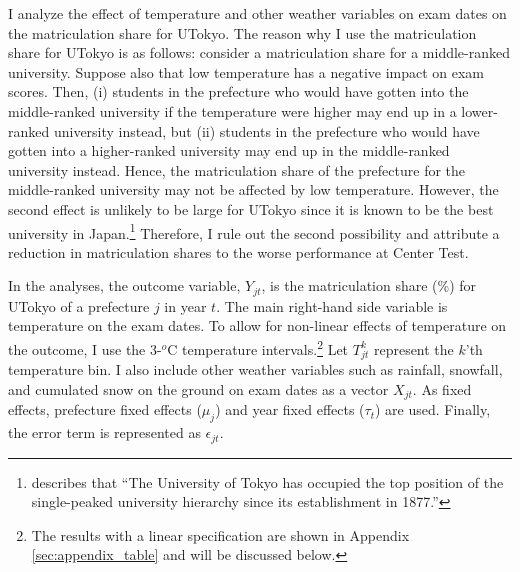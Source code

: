 \documentclass[12pt,letterpaper]{article}
\begin{document}
I analyze the effect of temperature and other weather variables on exam dates on the matriculation share for UTokyo.
The reason why I use the matriculation share for UTokyo is as follows:
consider a matriculation share for a middle-ranked university.
Suppose also that low temperature has a negative impact on exam scores.
Then, 
(i) students in the prefecture who would have gotten into the middle-ranked university if the temperature were higher may end up in a lower-ranked university instead, but
(ii) students in the prefecture who would have gotten into a higher-ranked university may end up in the middle-ranked university instead.
Hence, the matriculation share of the prefecture for the middle-ranked university may not be affected by low temperature.
However, the second effect is unlikely to be large for UTokyo since it is known to be the best university in Japan.\footnote{
  \citet{Kawaguchi2008} describes that ``The University of Tokyo has occupied the top position of the single-peaked university hierarchy since its establishment in 1877.''
}
Therefore, I rule out the second possibility and attribute a reduction in matriculation shares to the worse performance at Center Test.

In the analyses, the outcome variable, $Y_{jt}$, is the matriculation share (\%) for UTokyo of a prefecture $j$ in year $t$.
The main right-hand side variable is temperature on the exam dates.
To allow for non-linear effects of temperature on the outcome, I use the 3-$^o$C temperature intervals.\footnote{
  The results with a linear specification are shown in Appendix \ref{sec:appendix_table} and will be discussed below.
}
Let $T_{jt}^k$ represent the $k$'th temperature bin.
I also include other weather variables such as rainfall, snowfall, and cumulated snow on the ground on exam dates as a vector $X_{jt}$.
As fixed effects, prefecture fixed effects ($\mu_j$) and year fixed effects ($\tau_t$) are used.
Finally, the error term is represented as $\epsilon_{jt}$.
\end{document}
